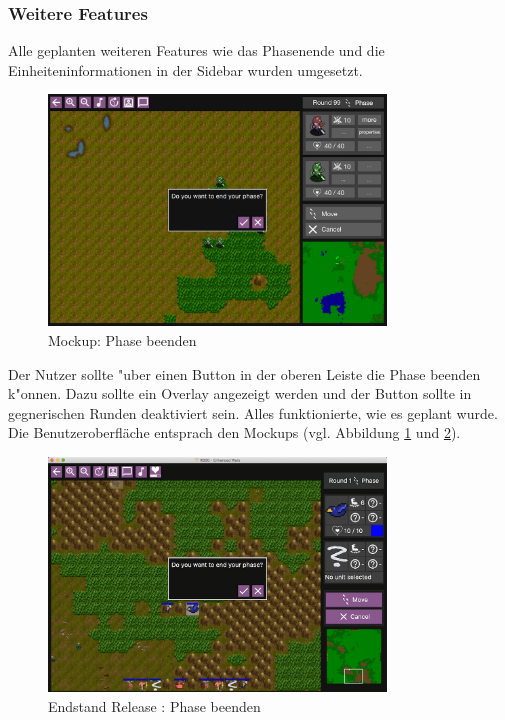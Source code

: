 \documentclass[12pt, titlepage]{scrartcl}
\newcommand{\RN}[1]{%
	\textup{\uppercase\expandafter{\romannumeral#1}}%
}
\newcounter{subsubsubsection}[subsubsection]
\begin{document}
			\subsubsection{Weitere Features}
				Alle geplanten weiteren Features wie das Phasenende und die Einheiteninformationen in der Sidebar wurden umgesetzt.
				\begin{figure}[H] 
					\centering
					\includegraphics[width=0.8\textwidth]{images/mockups/EndPhase.png}
					\caption{Mockup: Phase beenden}
					\label{Phase_End_2}
				\end{figure}
					Der Nutzer sollte "uber einen Button in der oberen Leiste die Phase beenden k"onnen. Dazu sollte ein Overlay angezeigt werden und der Button sollte in gegnerischen Runden deaktiviert sein. Alles funktionierte, wie es geplant wurde. Die Benutzeroberfl\"ache entsprach den Mockups (vgl. Abbildung \ref{Phase_End_2} und \ref{End_Phase_End}).
					\begin{figure}[H] 
						\centering
						\includegraphics[width=0.8\textwidth]{images/endOfRelease/EndPhase.png}
						\caption{Endstand Release \RN{3}: Phase beenden}
						\label{End_Phase_End}
					\end{figure}
\end{document}
